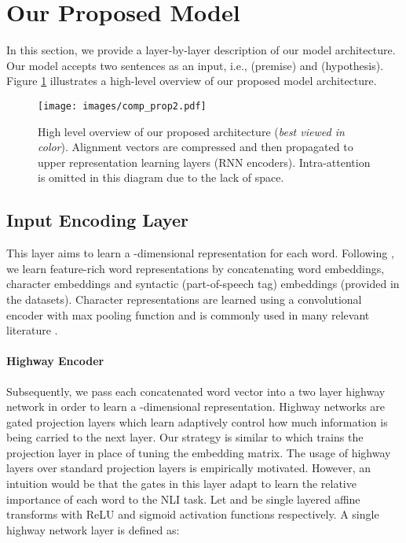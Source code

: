 \documentclass[11pt,a4paper]{article}
\begin{document}
\section{Our Proposed Model}
In this section, we provide a layer-by-layer description of our model architecture. Our model accepts two sentences as an input, i.e.,  (premise) and  (hypothesis). Figure \ref{fig:high_level} illustrates a high-level overview of our proposed model architecture.


\begin{figure}[ht]
  \centering
    \texttt{[image: images/comp\_prop2.pdf]}
    \caption{High level overview of our proposed architecture (\textit{best viewed in color}). Alignment vectors are compressed and then propagated to upper representation learning layers (RNN encoders). Intra-attention is omitted in this diagram due to the lack of space. }
    \label{fig:high_level}
\end{figure}


\subsection{Input Encoding Layer}{}
 This layer aims to learn a -dimensional representation for each word. Following \cite{DBLP:journals/corr/abs-1709-04348}, we learn feature-rich word representations by concatenating word embeddings, character embeddings and syntactic (part-of-speech tag) embeddings (provided in the datasets). Character representations are learned using a convolutional encoder with max pooling function and is commonly used in many relevant literature \cite{DBLP:conf/ijcai/WangHF17,DBLP:conf/repeval/ChenZLWJI17}.
\paragraph{Highway Encoder}
 Subsequently, we pass each concatenated word vector into a two layer highway network \cite{DBLP:journals/corr/SrivastavaGS15} in order to learn a -dimensional representation. Highway networks are gated projection layers which learn adaptively control how much information is being carried to the next layer. Our strategy is similar to \cite{DBLP:conf/emnlp/ParikhT0U16} which trains the projection layer in place of tuning the embedding matrix. The usage of highway layers over standard projection layers is empirically motivated. However, an intuition would be that the gates in this layer adapt to learn the relative importance of each word to the NLI task. Let  and  be single layered affine transforms with ReLU and sigmoid activation functions respectively. A single highway network layer is defined as:
 
\end{document}
